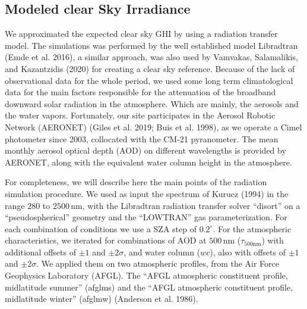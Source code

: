 \documentclass[
]{article}
\begin{document}
\hypertarget{modeled-clear-sky-irradiance}{%
\subsection{Modeled clear Sky Irradiance}\label{modeled-clear-sky-irradiance}}

We approximated the expected clear sky GHI by using a radiation transfer model. The
simulations was performed by the well established model Libradtran (Emde et al. 2016), a
similar approach, was also used by Vamvakas, Salamalikis, and Kazantzidis (2020) for creating a clear sky reference.
Because of the lack of observational data for the whole period, we used some long
term climatological data for the main factors responsible for the attenuation of the
broadband downward solar radiation in the atmosphere. Which are mainly, the aerosols
and the water vapors. Fortunately, our site participates in the Aerosol Robotic
Network (AERONET) (Giles et al. 2019; Buis et al. 1998), as we operate a Cimel photometer since
2003, collocated with the CM-21 pyranometer. The mean monthly aerosol optical depth
(AOD) on different wavelengths is provided by AERONET, along with the equivalent
water column height in the atmosphere.

For completeness, we will describe here the main points of the radiation simulation
procedure. We used as input the spectrum of Kurucz (1994) in the range \(280\) to
\(2500\,\text{nm}\), with the Libradtran radiation transfer solver ``disort'' on a
``pseudospherical'' geometry and the ``LOWTRAN'' gas parameterization. For each
combination of conditions we use a SZA step of \(0.2^\circ\).
For the atmospheric characteristics, we iterated for combinations of AOD at
\(500\,\text{nm}\) (\(\tau_{500\text{nm}}\)) with additional offsets of \(\pm1\) and
\(\pm2\sigma\), and water column (\(wc\)), also with offsets of \(\pm1\) and \(\pm2\sigma\).
We applied them on two atmospheric profiles, from the Air Force Geophysics
Laboratory (AFGL). The ``AFGL atmospheric constituent profile, midlatitude summer''
(afglms) and the ``AFGL atmospheric constituent profile, midlatitude winter'' (afglmw)
(Anderson et al. 1986).
\end{document}
